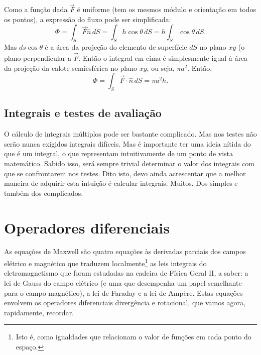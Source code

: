 \begin{examples}
        \hfill
        \begin{minipage}[t]{0.72\linewidth}
        Como a função dada $\vec F$ é uniforme (tem os mesmos módulo e
        orientação em todos os pontos), a expressão do fluxo pode ser
        simplificada:
        \begin{equation*}
        \Phi=\int_S\vec F\dot\hat n\,dS=\int_S h\cos\theta\,dS=h\int_S\cos\theta\,dS.
        \end{equation*}
        Mas $ds\cos\theta$ é a área da projeção do elemento de superfície $dS$
        no plano $xy$ (o plano perpendicular a $\vec F$. Então o integral em
        cima é simplesmente igual à área da projeção da calote semiesférica no
        plano $xy$, ou seja, $\pi a^2$. Então,
        \begin{equation*}
        \Phi=\int_S\vec F\cdot\hat n\,dS=\pi a^2 h.
        \end{equation*}
        \end{minipage}
\end{examples}

\subsection{Integrais e testes de avaliação}
O cálculo de integrais múltiplos pode ser bastante complicado. Mas nos testes
não serão nunca exigidos integrais difíceis. Mas é importante ter uma ideia
nítida do que é um integral, o que representam intuitivamente de um ponto de
vista matemático. Sabido isso, será sempre trivial determinar o valor dos
integrais com que se confrontarem nos testes. Dito isto, devo ainda acrescentar
que a melhor maneira de adquirir esta intuição é calcular integrais. Muitos. Dos
simples e também dos complicados.

\section{Operadores diferenciais}
As equações de Maxwell são quatro equações às derivadas parciais dos campos
elétrico e magnético que traduzem localmente\footnote{Isto é, como igualdades
que relacionam o valor de funções em cada ponto do espaço.} as leis integrais
do eletromagnetismo que foram estudadas na cadeira de Física Geral II, a saber:
a lei de Gauss do campo elétrico (e uma que desempenha um papel semelhante para
o campo magnético), a lei de Faraday e a lei de Ampère. Estas equações envolvem
os operadores diferenciais divergência e rotacional, que vamos agora,
rapidamente, recordar.

